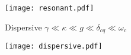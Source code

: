\documentclass{beamer}
\begin{document}
\begin{frame}
    \texttt{[image: resonant.pdf]}
\end{frame}
\begin{frame}
    \begin{block}{Dispersive}
            $\gamma \ll \kappa \ll g \ll \delta_{cq} \ll \omega_c$
    \end{block}
\end{frame}
\begin{frame}
    \texttt{[image: dispersive.pdf]}
\end{frame}
\printbibliography\
\end{document}
